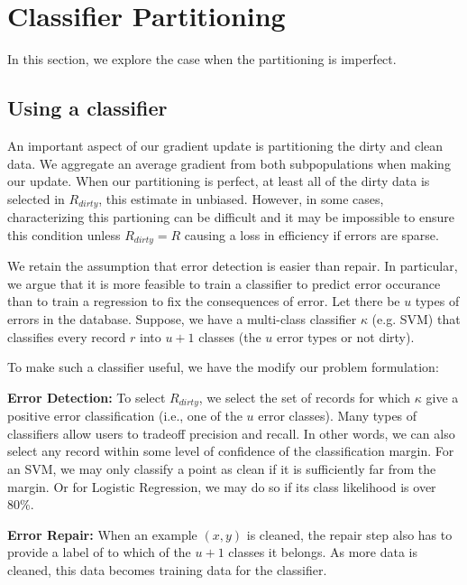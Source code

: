 \section{Classifier Partitioning}\label{imperfect} 
In this section, we explore the case when the partitioning is imperfect.

\subsection{Using a classifier}
An important aspect of our gradient update is partitioning the dirty and clean data.
We aggregate an average gradient from both subpopulations when making our update.
When our partitioning is perfect, at least all of the dirty data is selected in $R_{dirty}$, this estimate in unbiased.
However, in some cases, characterizing this partioning can be difficult and it may be impossible to ensure this condition unless $R_{dirty} = R$ causing a loss in efficiency if errors are sparse. 

We retain the assumption that error detection is easier than repair.
In particular, we argue that it is more feasible to train a classifier to predict error occurance than to train a regression to fix the consequences of error.
Let there be $u$ types of errors in the database.
Suppose, we have a multi-class classifier $\kappa$ (e.g. SVM) that classifies every record $r$ into
$u+1$ classes (the $u$ error types or not dirty).

To make such a classifier useful, we have the modify our problem formulation:

\vspace{0.5em}

\noindent\textbf{Error Detection: } To select $R_{dirty}$, we select the set of records for which $\kappa$ give a positive error classification (i.e., one of the $u$ error classes).
Many types of classifiers allow users to tradeoff precision and recall.
In other words, we can also select any record within some level of confidence of the classification margin.
For an SVM, we may only classify a point as clean if it is sufficiently far from the margin.
Or for Logistic Regression, we may do so if its class likelihood is over 80\%.

\vspace{0.5em}

\noindent\textbf{Error Repair: } When an example $(x,y)$ is cleaned, the repair step also has to provide a label of to which of the $u+1$ classes it belongs. As more data is cleaned, this data becomes training data for the classifier.

